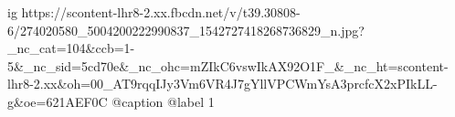  
 
 
 
 

\ifcmt
  ig https://scontent-lhr8-2.xx.fbcdn.net/v/t39.30808-6/274020580_5004200222990837_1542727418268736829_n.jpg?_nc_cat=104&ccb=1-5&_nc_sid=5cd70e&_nc_ohc=mZIkC6vswIkAX92O1F_&_nc_ht=scontent-lhr8-2.xx&oh=00_AT9rqqIJy3Vm6VR4J7gYllVPCWmYsA3prcfcX2xPIkLL-g&oe=621AEF0C
  @caption @label 1
\fi
